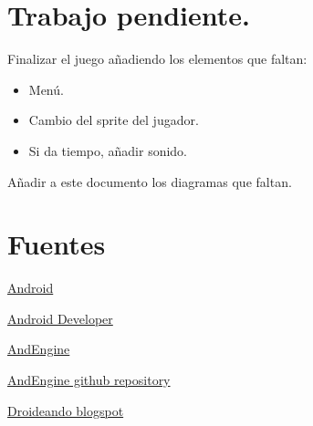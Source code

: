 \documentclass[12 pt, a4paper, twoside]{article}
\begin{document}
\section{Trabajo pendiente.}

Finalizar el juego añadiendo los elementos que faltan:

\begin{itemize}
  \item Menú.
  \item Cambio del sprite del jugador.
  \item Si da tiempo, añadir sonido.
\end{itemize}

Añadir a este documento los diagramas que faltan.


\section{Fuentes}
\href{http://www.android.com}{Android}

\href{http://developer.android.com/index.html}{Android Developer}

\href{http://www.andengine.org/}{AndEngine}

\href{https://github.com/nicolasgramlich/AndEngine}{AndEngine github repository}

\href{http://droideando.blogspot.com.es}{Droideando blogspot}
\end{document}
